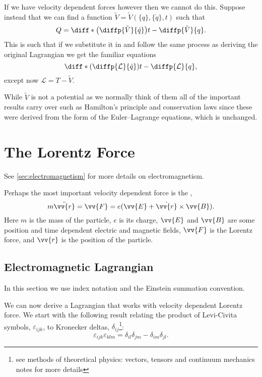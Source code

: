 \documentclass[fleqn]{NotesClass}
\newcommand*{\lagrangian}{\mathcal{L}}
\begin{document}
    If we have velocity dependent forces however then we cannot do this.
    Suppose instead that we can find a function \(\tilde{V} = \tilde{V}(\{q\}, \{\dot{q}\}, t)\) such that
    \begin{equation}
        Q = \diff*{\left( \diffp{\tilde{V}}{\dot{q}} \right)}{t} - \diffp{\tilde{V}}{q}.
    \end{equation}
    This is such that if we substitute it in and follow the same process as deriving the original Lagrangian we get the familiar equations
    \begin{equation}
        \diff*{\left( \diffp{\lagrangian}{\dot{q}} \right)}{t} - \diffp{\lagrangian}{q},
    \end{equation}
    except now \(\lagrangian = T - \tilde{V}\).
    
    While \(\tilde{V}\) is not a potential as we normally think of them all of the important results carry over such as Hamilton's principle and conservation laws since these were derived from the form of the Euler--Lagrange equations, which is unchanged.
    
    \section{The Lorentz Force}
    \begin{rmk}
        See \cref{sec:electromagnetism} for more details on electromagnetism.
    \end{rmk}
    
    Perhaps the most important velocity dependent force is the ,
    \begin{equation}
        m\ddot{\vv{r}} = \vv{F} = e(\vv{E} + \dot{\vv{r}} \times \vv{B}).
    \end{equation}
    Here \(m\) is the mass of the particle, \(e\) is its charge, \(\vv{E}\) and \(\vv{B}\) are some position and time dependent electric and magnetic fields, \(\vv{F}\) is the Lorentz force, and \(\vv{r}\) is the position of the particle.
    
    \subsection{Electromagnetic Lagrangian}
    \begin{wrn}
        In this section we use index notation and the Einstein summation convention.
    \end{wrn}
    We can now derive a Lagrangian that works with velocity dependent Lorentz force.
    We start with the following result relating the product of Levi-Civita symbols, \(\varepsilon_{ijk}\), to Kronecker deltas, \(\delta_{ij}\)\footnote{see methods of theoretical physics: vectors, tensors and continuum mechanics notes for more details}:
    \begin{equation}
        \varepsilon_{ijk}\varepsilon_{klm} = \delta_{il}\delta_{jm} - \delta_{im}\delta_{jl}.
    \end{equation}
    
\end{document}
